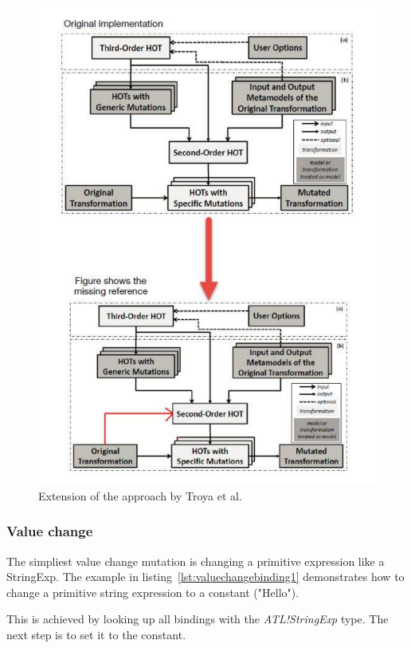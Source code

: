 \documentclass{llncs}
\begin{document}
\begin{figure}
	\centering
	\includegraphics[angle=0,width=1\textwidth,natwidth=610,natheight=642]{figures/AddBindingMissingReference.pdf}
	\caption{Extension of the approach by Troya et al. \cite{Bergmayr:2014}}
	\label{fig:addBindingReference}
\end{figure}


\subsubsection{Value change}

The simpliest value change mutation is changing a primitive expression like a StringExp. The example in listing~\ref{lst:valuechangebinding1} demonstrates how to change a primitive string expression to a constant ("Hello").

This is achieved by looking up all bindings with the \emph{ATL!StringExp} type. The next step is to set it to the constant.
\end{document}
